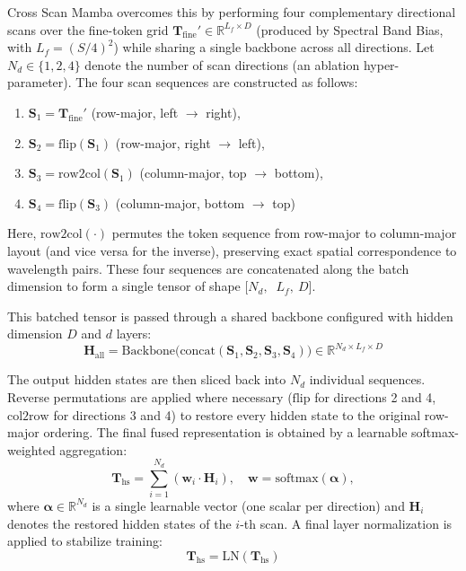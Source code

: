 \documentclass[pdflatex,sn-mathphys-num]{sn-jnl}%
\begin{document}
Cross Scan Mamba overcomes this by performing four complementary directional scans over the fine-token grid $\mathbf{T}_\text{fine}' \in \mathbb{R}^{L_f \times D}$ (produced by Spectral Band Bias, with $L_f = (S/4)^2$) while sharing a single backbone across all directions. Let $N_d \in \{1,2,4\}$ denote the number of scan directions (an ablation hyper-parameter). The four scan sequences are constructed as follows:
\begin{enumerate}
\item $\mathbf{S}_1 = \mathbf{T}_\text{fine}'$ \quad (row-major, left $\to$ right),
\item $\mathbf{S}_2 = \text{flip}(\mathbf{S}_1)$ \quad (row-major, right $\to$ left),
\item $\mathbf{S}_3 = \text{row2col}(\mathbf{S}_1)$ \quad (column-major, top $\to$ bottom),
\item $\mathbf{S}_4 = \text{flip}(\mathbf{S}_3)$ \quad (column-major, bottom $\to$ top)
\end{enumerate}

Here, $\text{row2col}(\cdot)$ permutes the token sequence from row-major to column-major layout (and vice versa for the inverse), preserving exact spatial correspondence to wavelength pairs. These four sequences are concatenated along the batch dimension to form a single tensor of shape $[N_d,\ $ $L_f,\ D]$.

This batched tensor is passed through a shared backbone configured with hidden dimension $D$ and $d$ layers:
\begin{equation}
    \mathbf{H}_\text{all} = \text{Backbone}\bigl(\text{concat}(\mathbf{S}_1, \mathbf{S}_2, \mathbf{S}_3, \mathbf{S}_4)\bigr) \in \mathbb{R}^{N_d \times L_f \times D}
\end{equation}

The output hidden states are then sliced back into $N_d$ individual sequences. Reverse permutations are applied where necessary ($\text{flip}$ for directions 2 and 4, $\text{col2row}$ for directions 3 and 4) to restore every hidden state to the original row-major ordering. The final fused representation is obtained by a learnable softmax-weighted aggregation:
\begin{equation}
    \mathbf{T}_\text{hs} = \sum_{i=1}^{N_d} (\mathbf{w}_i \cdot \mathbf{H}_i), \quad \mathbf{w} = \text{softmax}(\boldsymbol{\alpha}),
\end{equation}
where $\boldsymbol{\alpha} \in \mathbb{R}^{N_d}$ is a single learnable vector (one scalar per direction) and $\mathbf{H}_i$ denotes the restored hidden states of the $i$-th scan. A final layer normalization is applied to stabilize training:
\begin{equation}
    \mathbf{T}_\text{hs} = \text{LN}(\mathbf{T}_\text{hs})
\end{equation}
\end{document}
